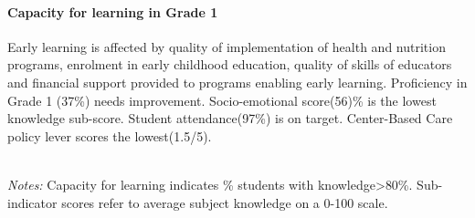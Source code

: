 \documentclass[twocolumn]{article}
\let\oldparagraph\paragraph
\renewcommand{\paragraph}[1]{\oldparagraph{#1}\mbox{}}
\begin{document}
\hypertarget{capacity-for-learning-in-grade-1}{%
\paragraph{\texorpdfstring{\textbf{Capacity for learning in Grade
1}}{Capacity for learning in Grade 1}}\label{capacity-for-learning-in-grade-1}}

Early learning is affected by quality of implementation of health and
nutrition programs, enrolment in early childhood education, quality of
skills of educators and financial support provided to programs enabling
early learning. Proficiency in Grade 1 (37\%) needs improvement.
Socio-emotional score(56)\% is the lowest knowledge sub-score. Student
attendance(97\%) is on target. Center-Based Care policy lever scores the
lowest(1.5/5). \vfill\null

\begin{table}[H]
\\
\color{darkgray}\scriptsize{\textit{Notes:} Capacity for learning indicates \% students with knowledge\textgreater{80\%}. Sub-indicator scores refer to average subject knowledge on a 0-100 scale.}
\end{table}
\raggedbottom
\end{document}
